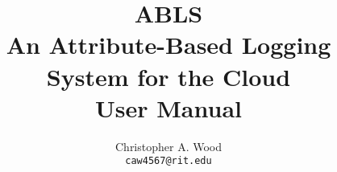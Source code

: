 \documentclass{book}
\begin{document}

\pagestyle{empty}
\title{\textbf{ABLS} \\ An Attribute-Based Logging System for the Cloud \\{\large User Manual}}
\author{Christopher A. Wood \\ {\tt caw4567@rit.edu}}
\maketitle

\pagestyle{fancy}

\tableofcontents



{}

\end{document}
